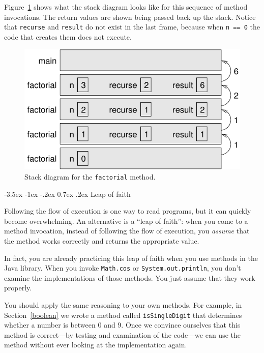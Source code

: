\documentclass[12pt]{book}
\makeatletter
\theoremstyle{exercise}
\newcommand{\java}[1]{\verb"#1"}
\renewcommand{\section}{\@startsection {section}{1}{\z@}%
    {-3.5ex \@plus -1ex \@minus -.2ex}%
    {0.7ex \@plus.2ex}%
    {\normalfont\Large\bfseries}}
\newcommand{\java}[1]{\lstinline{#1}} %
\makeatother
\begin{document}
Figure~\ref{fig:stack3} shows what the stack diagram looks like for this sequence of method invocations.
The return values are shown being passed back up the stack.
Notice that \java{recurse} and \java{result} do not exist in the last frame, because when \java{n == 0} the code that creates them does not execute.

\begin{figure}[!h]
\begin{center}
\includegraphics{figs/stack3.pdf}
\caption{Stack diagram for the \java{factorial} method.}
\label{fig:stack3}
\end{center}
\end{figure}


\section{Leap of faith}
\label{leap of faith}


Following the flow of execution is one way to read programs, but it can quickly become overwhelming.
An alternative is a ``leap of faith'':
when you come to a method invocation, instead of following the flow of execution, you {\em assume} that the method works correctly and returns the appropriate value.

In fact, you are already practicing this leap of faith when you use methods in the Java library.
When you invoke \java{Math.cos} or \java{System.out.println}, you don't examine the implementations of those methods.
You just assume that they work properly.

You should apply the same reasoning to your own methods.
For example, in Section~\ref{boolean} we wrote a method called \java{isSingleDigit} that determines whether a number is between 0 and 9.
Once we convince ourselves that this method is correct---by testing and examination of the code---we can use the method without ever looking at the implementation again.
\end{document}
